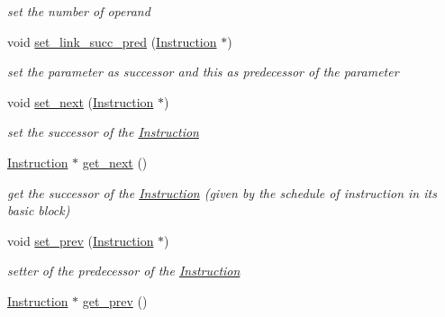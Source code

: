 \begin{DoxyCompactItemize}
\begin{DoxyCompactList}\small\item\em set the number of operand \end{DoxyCompactList}\item 
\hypertarget{class_instruction_ab8f6e21bc94df2198678a3cdbcfaa12e}{}void \hyperlink{class_instruction_ab8f6e21bc94df2198678a3cdbcfaa12e}{set\+\_\+link\+\_\+succ\+\_\+pred} (\hyperlink{class_instruction}{Instruction} $\ast$)\label{class_instruction_ab8f6e21bc94df2198678a3cdbcfaa12e}

\begin{DoxyCompactList}\small\item\em set the parameter as successor and this as predecessor of the parameter \end{DoxyCompactList}\item 
\hypertarget{class_instruction_a2fb436e52a0cc89e7ec08bf0e105bba3}{}void \hyperlink{class_instruction_a2fb436e52a0cc89e7ec08bf0e105bba3}{set\+\_\+next} (\hyperlink{class_instruction}{Instruction} $\ast$)\label{class_instruction_a2fb436e52a0cc89e7ec08bf0e105bba3}

\begin{DoxyCompactList}\small\item\em set the successor of the \hyperlink{class_instruction}{Instruction} \end{DoxyCompactList}\item 
\hypertarget{class_instruction_a93d5d6186afcf358c5a21f4c57a0d72e}{}\hyperlink{class_instruction}{Instruction} $\ast$ \hyperlink{class_instruction_a93d5d6186afcf358c5a21f4c57a0d72e}{get\+\_\+next} ()\label{class_instruction_a93d5d6186afcf358c5a21f4c57a0d72e}

\begin{DoxyCompactList}\small\item\em get the successor of the \hyperlink{class_instruction}{Instruction} (given by the schedule of instruction in its basic block) \end{DoxyCompactList}\item 
\hypertarget{class_instruction_a69d2992a0eb1fbe5fb6a38b52e13a804}{}void \hyperlink{class_instruction_a69d2992a0eb1fbe5fb6a38b52e13a804}{set\+\_\+prev} (\hyperlink{class_instruction}{Instruction} $\ast$)\label{class_instruction_a69d2992a0eb1fbe5fb6a38b52e13a804}

\begin{DoxyCompactList}\small\item\em setter of the predecessor of the \hyperlink{class_instruction}{Instruction} \end{DoxyCompactList}\item 
\hypertarget{class_instruction_afd6f27235469926b1e7979220495a6f0}{}\hyperlink{class_instruction}{Instruction} $\ast$ \hyperlink{class_instruction_afd6f27235469926b1e7979220495a6f0}{get\+\_\+prev} ()\label{class_instruction_afd6f27235469926b1e7979220495a6f0}


\end{DoxyCompactItemize}
